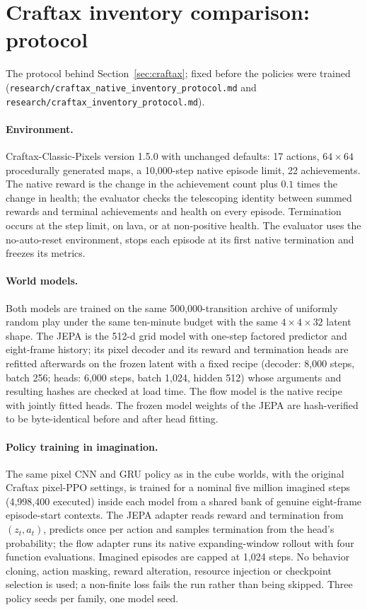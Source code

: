\section{Craftax inventory comparison: protocol}
\label{app:inventory}

The protocol behind Section~\ref{sec:craftax}; fixed before the policies were trained
(\texttt{research/craftax\_native\_inventory\_protocol.md} and
\texttt{research/craftax\_inventory\_protocol.md}).

\paragraph{Environment.}
Craftax-Classic-Pixels version 1.5.0 with unchanged defaults: 17 actions, $64\times64$
procedurally generated maps, a 10,000-step native episode limit, 22 achievements. The native reward
is the change in the achievement count plus $0.1$ times the change in health; the evaluator checks
the telescoping identity between summed rewards and terminal achievements and health on every
episode. Termination occurs at the step limit, on lava, or at non-positive health. The evaluator
uses the no-auto-reset environment, stops each episode at its first native termination and freezes
its metrics.

\paragraph{World models.}
Both models are trained on the same 500,000-transition archive of uniformly random play under the
same ten-minute budget with the same $4\times4\times32$ latent shape. The JEPA is the 512-d grid
model with one-step factored predictor and eight-frame history; its pixel decoder and its reward
and termination heads are refitted afterwards on the frozen latent with a fixed recipe (decoder:
8,000 steps, batch 256; heads: 6,000 steps, batch 1,024, hidden 512) whose arguments and resulting
hashes are checked at load time. The flow model is the native recipe with jointly fitted heads.
The frozen model weights of the JEPA are hash-verified to be byte-identical before and after head
fitting.

\paragraph{Policy training in imagination.}
The same pixel CNN and GRU policy as in the cube worlds, with the original Craftax pixel-PPO
settings, is trained for a nominal five million imagined steps (4,998,400 executed) inside each
model from a shared bank of genuine eight-frame episode-start contexts. The JEPA adapter reads
reward and termination from $(z_t,a_t)$, predicts once per action and samples termination from the
head's probability; the flow adapter runs its native expanding-window rollout with four function
evaluations. Imagined episodes are capped at 1,024 steps. No behavior cloning, action masking,
reward alteration, resource injection or checkpoint selection is used; a non-finite loss fails the
run rather than being skipped. Three policy seeds per family, one model seed.

